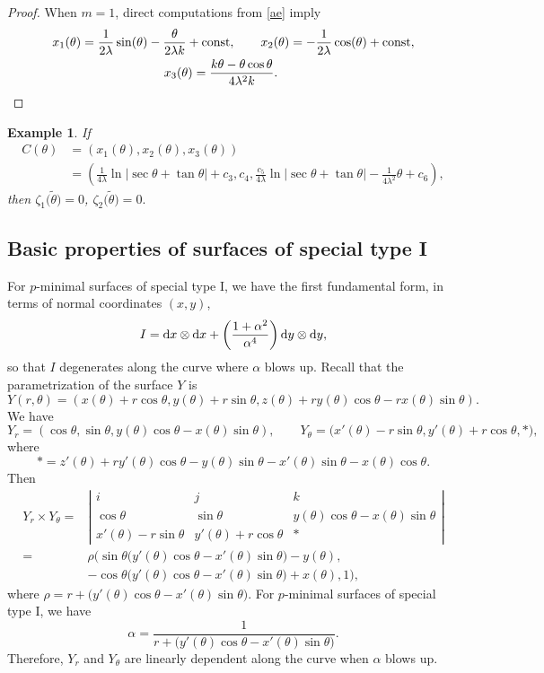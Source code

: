 \documentclass[10pt,a4paper]{amsart}
\numberwithin{equation}{section}
\newtheorem{Example}[Theorem]{Example}
\begin{document}
\begin{proof}
When $m =1$, direct computations from \eqref{ae} imply
\begin{gather*}
x_1(\theta)=\frac{1}{2\lambda}\sin(\theta)-\frac{\theta}{2\lambda k}+\text{\rm const},\qquad
x_2(\theta)=-\frac{1}{2\lambda}\cos(\theta)+\text{\rm const},\\
x_3(\theta)=\frac{k\theta-\theta\cos\theta}{4\lambda^2k}.\tag*{\qed}
\end{gather*} \renewcommand{\qed}{}
\end{proof}

\begin{Example}
If
\begin{align*}
C(\theta )& =(x_{1}(\theta ),x_{2}(\theta ),x_{3}(\theta )) \\
& =\left(\frac{1}{4\lambda }\ln {|\sec {\theta }+\tan {\theta }|}+c_{3},c_{4},
\frac{c_{5}}{4\lambda }\ln {|\sec {\theta }+\tan {\theta }|}-\frac{1}{
4\lambda ^{2}}\theta +c_{6}\right),
\end{align*}
then $\zeta _{1}\bigl(\tilde{\theta}\bigr)=0$, $\zeta _{2}\bigl(\tilde{\theta}\bigr)=0.$
\end{Example}

\subsection{Basic properties of surfaces of special type I}\label{section5.2}
For $p$-minimal surfaces of special type I, we have the first fundamental form, in terms of normal coordinates $(x,y)$,
\[I={\rm d}x\otimes {\rm d}x+\left(\frac{1+\alpha^{2}}{\alpha^4}\right){\rm d}y\otimes {\rm d}y,\]
so that $I$ degenerates along the curve where $\alpha$ blows up. Recall that the parametrization of the surface $Y$ is
\[Y(r,\theta)=(x(\theta)+r\cos{\theta},y(\theta)+r\sin{\theta},z(\theta)+ry(\theta)\cos{\theta}-rx(\theta)\sin{\theta}).\]
We have
\[
Y_{r}=(\cos{\theta},\sin{\theta},y(\theta)\cos{\theta}-x(\theta)\sin{\theta}),\qquad
Y_{\theta}=\bigl(x'(\theta)-r\sin{\theta},y'(\theta)+r\cos{\theta},*\bigr),
\]
where
\[*=z'(\theta)+ry'(\theta)\cos{\theta}-y(\theta)\sin{\theta}-x'(\theta)\sin{\theta}-x(\theta)\cos{\theta}.\]
Then
\begin{align*}
Y_{r}\times Y_{\theta}={}&\left|\begin{matrix}
i&j&k\\
\cos{\theta}&\sin{\theta}&y(\theta)\cos{\theta}-x(\theta)\sin{\theta}\\
x'(\theta)-r\sin{\theta}&y'(\theta)+r\cos{\theta}&*
\end{matrix}\right|\\
={}&\rho\bigl(\sin{\theta}\bigl(y'(\theta)\cos{\theta}-x'(\theta)\sin{\theta}\bigr)-y(\theta),\\
&-\cos{\theta}\bigl(y'(\theta)\cos{\theta}-x'(\theta)\sin{\theta}\bigr)+x(\theta),1\bigr),
\end{align*}
where
$\rho=r+\bigl(y'(\theta)\cos{\theta}-x'(\theta)\sin{\theta}\bigr)$.
For $p$-minimal surfaces of special type I, we have
 \[
 \alpha=\frac{1}{r+\bigl(y'(\theta)\cos{\theta}-x'(\theta)\sin{\theta}\bigr)}.
 \]
Therefore, $Y_{r}$ and $Y_{\theta}$ are linearly dependent along the curve when $\alpha$ blows up.
\end{document}
